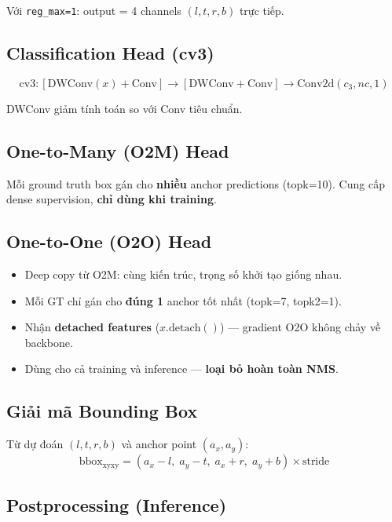 Với \texttt{reg\_max=1}: output = 4 channels $(l, t, r, b)$ trực tiếp.

\subsection{Classification Head (cv3)}

\begin{equation}
    \text{cv3}: [\text{DWConv}(x) + \text{Conv}] \to [\text{DWConv} + \text{Conv}] \to \text{Conv2d}(c_3, nc, 1)
\end{equation}

DWConv giảm tính toán so với Conv tiêu chuẩn.

\subsection{One-to-Many (O2M) Head}

Mỗi ground truth box gán cho \textbf{nhiều} anchor predictions (topk=10). Cung cấp dense supervision, \textbf{chỉ dùng khi training}.

\subsection{One-to-One (O2O) Head}

\begin{itemize}
    \item Deep copy từ O2M: cùng kiến trúc, trọng số khởi tạo giống nhau.
    \item Mỗi GT chỉ gán cho \textbf{đúng 1} anchor tốt nhất (topk=7, topk2=1).
    \item Nhận \textbf{detached features} ($x.\text{detach}()$) --- gradient O2O không chảy về backbone.
    \item Dùng cho cả training và inference --- \textbf{loại bỏ hoàn toàn NMS}.
\end{itemize}

\subsection{Giải mã Bounding Box}

Từ dự đoán $(l, t, r, b)$ và anchor point $(a_x, a_y)$:
\begin{equation}
    \text{bbox}_{\text{xyxy}} = (a_x - l, \; a_y - t, \; a_x + r, \; a_y + b) \times \text{stride}
\end{equation}

\subsection{Postprocessing (Inference)}

